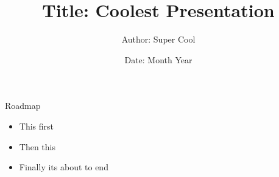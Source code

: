 \documentclass[usenames,dvipsnames]{beamer}
\title{Title: Coolest Presentation}
\author{Author: Super Cool}
\date{Date: Month Year}
\begin{document}
\maketitle

\begin{frame}{Roadmap}

\begin{itemize}
    \item This first
    \item Then this
    \item Finally its about to end
\end{itemize}
    
\end{frame}
\end{document}
